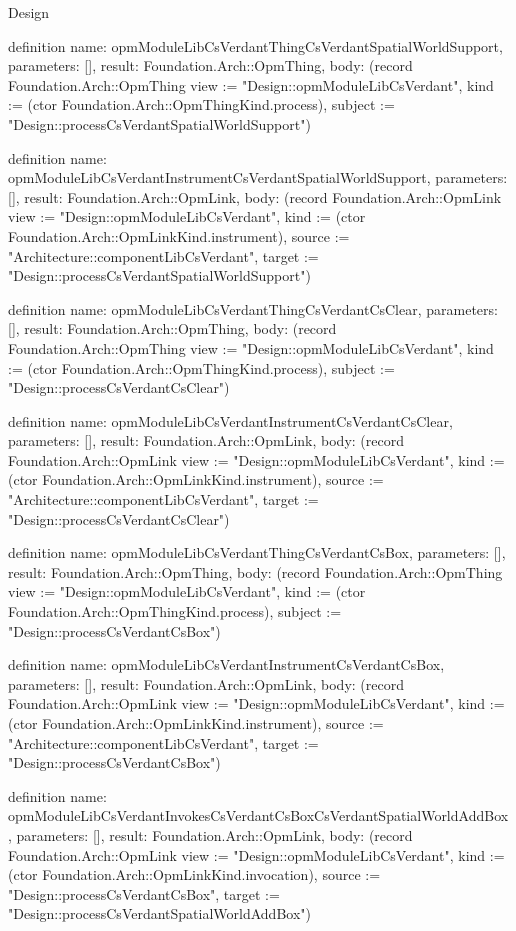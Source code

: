 \begin{lexlean}{Design}
\begin{semanticmodule}
definition{
  name: opmModuleLibCsVerdantThingCsVerdantSpatialWorldSupport,
  parameters: [],
  result: Foundation.Arch::OpmThing,
  body: (record Foundation.Arch::OpmThing {view := "Design::opmModuleLibCsVerdant", kind := (ctor Foundation.Arch::OpmThingKind.process), subject := "Design::processCsVerdantSpatialWorldSupport"})
}

definition{
  name: opmModuleLibCsVerdantInstrumentCsVerdantSpatialWorldSupport,
  parameters: [],
  result: Foundation.Arch::OpmLink,
  body: (record Foundation.Arch::OpmLink {view := "Design::opmModuleLibCsVerdant", kind := (ctor Foundation.Arch::OpmLinkKind.instrument), source := "Architecture::componentLibCsVerdant", target := "Design::processCsVerdantSpatialWorldSupport"})
}

definition{
  name: opmModuleLibCsVerdantThingCsVerdantCsClear,
  parameters: [],
  result: Foundation.Arch::OpmThing,
  body: (record Foundation.Arch::OpmThing {view := "Design::opmModuleLibCsVerdant", kind := (ctor Foundation.Arch::OpmThingKind.process), subject := "Design::processCsVerdantCsClear"})
}

definition{
  name: opmModuleLibCsVerdantInstrumentCsVerdantCsClear,
  parameters: [],
  result: Foundation.Arch::OpmLink,
  body: (record Foundation.Arch::OpmLink {view := "Design::opmModuleLibCsVerdant", kind := (ctor Foundation.Arch::OpmLinkKind.instrument), source := "Architecture::componentLibCsVerdant", target := "Design::processCsVerdantCsClear"})
}

definition{
  name: opmModuleLibCsVerdantThingCsVerdantCsBox,
  parameters: [],
  result: Foundation.Arch::OpmThing,
  body: (record Foundation.Arch::OpmThing {view := "Design::opmModuleLibCsVerdant", kind := (ctor Foundation.Arch::OpmThingKind.process), subject := "Design::processCsVerdantCsBox"})
}

definition{
  name: opmModuleLibCsVerdantInstrumentCsVerdantCsBox,
  parameters: [],
  result: Foundation.Arch::OpmLink,
  body: (record Foundation.Arch::OpmLink {view := "Design::opmModuleLibCsVerdant", kind := (ctor Foundation.Arch::OpmLinkKind.instrument), source := "Architecture::componentLibCsVerdant", target := "Design::processCsVerdantCsBox"})
}

definition{
  name: opmModuleLibCsVerdantInvokesCsVerdantCsBoxCsVerdantSpatialWorldAddBox,
  parameters: [],
  result: Foundation.Arch::OpmLink,
  body: (record Foundation.Arch::OpmLink {view := "Design::opmModuleLibCsVerdant", kind := (ctor Foundation.Arch::OpmLinkKind.invocation), source := "Design::processCsVerdantCsBox", target := "Design::processCsVerdantSpatialWorldAddBox"})
}


\end{semanticmodule}
\end{lexlean}
